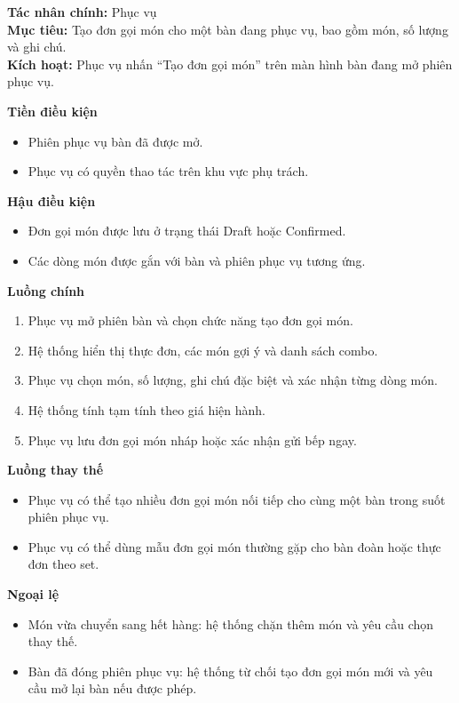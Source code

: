 \documentclass[11pt,a4paper]{article}
\begin{document}
    \begin{usecasebox}[title={UC-ORD-01 --- Tạo đơn gọi món tại bàn}]
    \textbf{Tác nhân chính:} Phục vụ\\
    \textbf{Mục tiêu:} Tạo đơn gọi món cho một bàn đang phục vụ, bao gồm món, số lượng và ghi chú.\\
    \textbf{Kích hoạt:} Phục vụ nhấn \enquote{Tạo đơn gọi món} trên màn hình bàn đang mở phiên phục vụ.

    \medskip
    \textbf{Tiền điều kiện}
    \begin{itemize}[leftmargin=1.8em]
  \item Phiên phục vụ bàn đã được mở.
  \item Phục vụ có quyền thao tác trên khu vực phụ trách.
\end{itemize}

    \textbf{Hậu điều kiện}
    \begin{itemize}[leftmargin=1.8em]
  \item Đơn gọi món được lưu ở trạng thái \textsf{Draft} hoặc \textsf{Confirmed}.
  \item Các dòng món được gắn với bàn và phiên phục vụ tương ứng.
\end{itemize}

    \textbf{Luồng chính}
    \begin{enumerate}[leftmargin=1.8em]
  \item Phục vụ mở phiên bàn và chọn chức năng tạo đơn gọi món.
  \item Hệ thống hiển thị thực đơn, các món gợi ý và danh sách combo.
  \item Phục vụ chọn món, số lượng, ghi chú đặc biệt và xác nhận từng dòng món.
  \item Hệ thống tính tạm tính theo giá hiện hành.
  \item Phục vụ lưu đơn gọi món nháp hoặc xác nhận gửi bếp ngay.
\end{enumerate}

    \textbf{Luồng thay thế}
    \begin{itemize}[leftmargin=1.8em]
  \item Phục vụ có thể tạo nhiều đơn gọi món nối tiếp cho cùng một bàn trong suốt phiên phục vụ.
  \item Phục vụ có thể dùng mẫu đơn gọi món thường gặp cho bàn đoàn hoặc thực đơn theo set.
\end{itemize}

    \textbf{Ngoại lệ}
    \begin{itemize}[leftmargin=1.8em]
  \item Món vừa chuyển sang hết hàng: hệ thống chặn thêm món và yêu cầu chọn thay thế.
  \item Bàn đã đóng phiên phục vụ: hệ thống từ chối tạo đơn gọi món mới và yêu cầu mở lại bàn nếu được phép.
\end{itemize}


\end{usecasebox}
\end{document}
